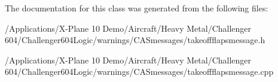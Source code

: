 The documentation for this class was generated from the following files\-:\begin{DoxyCompactItemize}
\item 
/\-Applications/\-X-\/\-Plane 10 Demo/\-Aircraft/\-Heavy Metal/\-Challenger 604/\-Challenger604\-Logic/warnings/\-C\-A\-Smessages/takeoffflapsmessage.\-h\item 
/\-Applications/\-X-\/\-Plane 10 Demo/\-Aircraft/\-Heavy Metal/\-Challenger 604/\-Challenger604\-Logic/warnings/\-C\-A\-Smessages/takeoffflapsmessage.\-cpp\end{DoxyCompactItemize}
